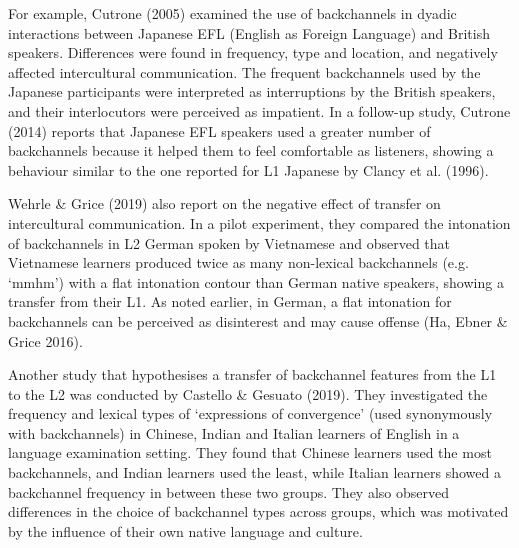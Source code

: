 \begin{styleStandard}
For example, Cutrone (2005) examined the use of backchannels in dyadic interactions between Japanese EFL (English as Foreign Language) and British speakers. Differences were found in frequency, type and location, and negatively affected intercultural communication. The frequent backchannels used by the Japanese participants were interpreted as interruptions by the British speakers, and their interlocutors were perceived as impatient. In a follow-up study, Cutrone (2014) reports that Japanese EFL speakers used a greater number of backchannels because it helped them to feel comfortable as listeners, showing a behaviour similar to the one reported for L1 Japanese by Clancy et al. (1996).
\end{styleStandard}

\begin{styleStandard}
Wehrle \& Grice (2019) also report on the negative effect of transfer on intercultural communication. In a pilot experiment, they compared the intonation of backchannels in L2 German spoken by Vietnamese and observed that Vietnamese learners produced twice as many non-lexical backchannels (e.g. ‘mmhm’) with a flat intonation contour than German native speakers, showing a transfer from their L1. As noted earlier, in German, a flat intonation for backchannels can be perceived as disinterest and may cause offense (Ha, Ebner \& Grice 2016).
\end{styleStandard}

\begin{styleStandard}
Another study that hypothesises a transfer of backchannel features from the L1 to the L2 was conducted by Castello \& Gesuato (2019). They investigated the frequency and lexical types of ‘expressions of convergence’ (used synonymously with backchannels) in Chinese, Indian and Italian learners of English in a language examination setting. They found that Chinese learners used the most backchannels, and Indian learners used the least, while Italian learners showed a backchannel frequency in between these two groups. They also observed differences in the choice of backchannel types across groups, which was motivated by the influence of their own native language and culture.
\end{styleStandard}

